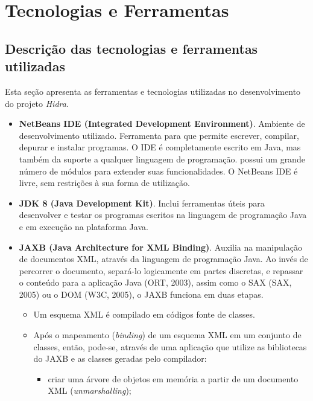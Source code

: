 \chapter{Tecnologias e Ferramentas} \label{chapter:ferramentas}

\section{Descrição das tecnologias e ferramentas utilizadas}
Esta seção apresenta as ferramentas e tecnologias utilizadas no desenvolvimento do projeto \textit{Hidra}.



\begin{itemize}
\item \textbf{NetBeans IDE (Integrated Development Environment)}. Ambiente de desenvolvimento utilizado. Ferramenta para que permite escrever, compilar, depurar e instalar programas. O IDE é completamente escrito em Java, mas também da suporte a qualquer linguagem de programação. possui um grande número de módulos para extender suas funcionalidades. O NetBeans IDE é livre, sem restrições à sua forma de utilização.

\item \textbf{JDK 8 (Java Development Kit)}. Inclui ferramentas úteis para desenvolver e testar os programas escritos na linguagem de programação Java e em execução na plataforma Java.

\item \textbf{JAXB (Java Architecture for XML Binding)}. \cite{dissertacaoHenriqueFaria2005} Auxilia na manipulação de documentos XML, através da linguagem de programação Java. Ao invés de percorrer o documento, separá-lo logicamente em partes discretas, e repassar o conteúdo para a aplicação Java (ORT, 2003), assim como o SAX (SAX, 2005) ou o DOM (W3C, 2005), o JAXB funciona em duas etapas.
    \begin{itemize}
    \item Um esquema XML é compilado em códigos fonte de classes.
    
    \item Após o mapeamento (\textit{binding}) de um esquema XML em um conjunto de classes, então, pode-se, através de uma aplicação que utilize as bibliotecas do JAXB e as classes geradas pelo compilador:
        \begin{itemize}

        \item criar uma árvore de objetos em memória a partir de um documento XML (\textit{unmarshalling});
        

\end{itemize}
\end{itemize}
\end{itemize}
